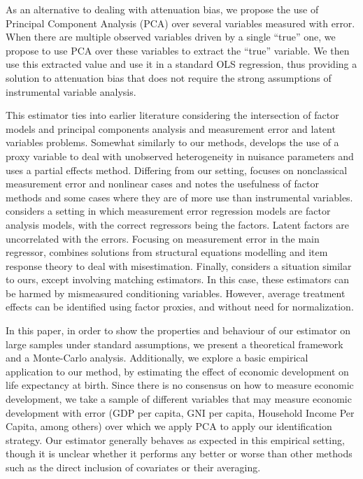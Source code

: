 \documentclass[10pt]{article}
\begin{document}
        As an alternative to dealing with attenuation bias, we propose the use of Principal Component Analysis (PCA) over several variables measured with error. When there are multiple observed variables driven by a single ``true'' one, we propose to use PCA over these variables to extract the ``true'' variable. We then use this extracted value and use it in a standard OLS regression, thus providing a solution to attenuation bias that does not require the strong assumptions of instrumental variable analysis.

        This estimator ties into earlier literature considering the intersection of factor models and principal components analysis and measurement error and latent variables problems. Somewhat similarly to our methods, \cite{nagasawa_identication_2020} develops the use of a proxy variable to deal with unobserved heterogeneity in nuisance parameters and uses a partial effects method. Differing from our setting, \cite{schennach_recent_2016} focuses on nonclassical measurement error and nonlinear cases and notes the usefulness of factor methods and some cases where they are of more use than instrumental variables. \cite{wegge_local_1996} considers a setting in which measurement error regression models are factor analysis models, with the correct regressors being the factors. Latent factors are uncorrelated with the errors. Focusing on measurement error in the main regressor, \cite{schofield_correcting_2015} combines solutions from structural equations modelling and item response theory to deal with misestimation. Finally, \cite{heckman_matching_2010} considers a situation similar to ours, except involving matching estimators. In this case, these estimators can be harmed by mismeasured conditioning variables. However, average treatment effects can be identified using factor proxies, and without need for normalization.

        In this paper, in order to show the properties and behaviour of our estimator on large samples under standard assumptions, we present a theoretical framework and a Monte-Carlo analysis. Additionally, we explore a basic empirical application to our method, by estimating the effect of economic development on life expectancy at birth. Since there is no consensus on how to measure economic development, we take a sample of different variables that may measure economic development with error (GDP per capita, GNI per capita, Household Income Per Capita, among others) over which we apply PCA to apply our identification strategy. Our estimator generally behaves as expected in this empirical setting, though it is unclear whether it performs any better or worse than other methods such as the direct inclusion of covariates or their averaging.
\end{document}
